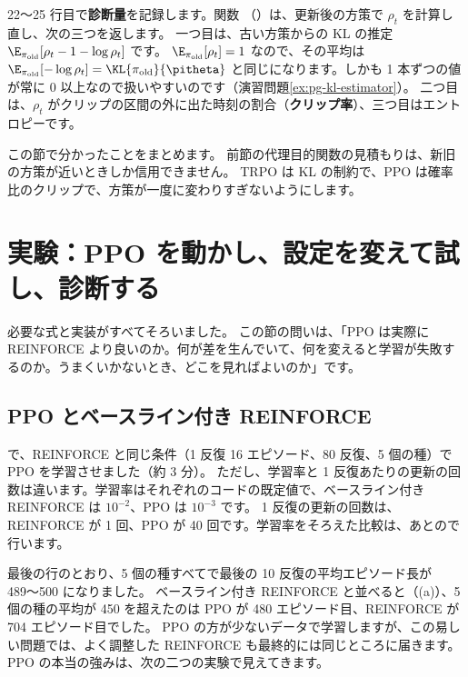 22〜25 行目で\textbf{診断量}を記録します。関数 （）は、更新後の方策で $\rho_t$ を計算し直し、次の三つを返します。
一つ目は、古い方策からの KL の推定 $\E_{\pi_{\text{old}}}[\rho_t-1-\log\rho_t]$ です。
$\E_{\pi_{\text{old}}}[\rho_t]=1$ なので、その平均は $\E_{\pi_{\text{old}}}[-\log\rho_t]=\KL{\pi_{\text{old}}}{\pitheta}$ と同じになります。しかも 1 本ずつの値が常に 0 以上なので扱いやすいのです（演習問題\ref{ex:pg-kl-estimator}）。
二つ目は、$\rho_t$ がクリップの区間の外に出た時刻の割合（\textbf{クリップ率}）、三つ目はエントロピーです。

この節で分かったことをまとめます。
前節の代理目的関数の見積もりは、新旧の方策が近いときしか信用できません。
TRPO は KL の制約で、PPO は確率比のクリップで、方策が一度に変わりすぎないようにします。

\section{実験：PPO を動かし、設定を変えて試し、診断する}\label{sec:pg-experiments}

必要な式と実装がすべてそろいました。
この節の問いは、「PPO は実際に REINFORCE より良いのか。何が差を生んでいて、何を変えると学習が失敗するのか。うまくいかないとき、どこを見ればよいのか」です。

\subsection*{PPO とベースライン付き REINFORCE}

 で、REINFORCE と同じ条件（1 反復 16 エピソード、80 反復、5 個の種）で PPO を学習させました（約 3 分）。
ただし、学習率と 1 反復あたりの更新の回数は違います。学習率はそれぞれのコードの既定値で、ベースライン付き REINFORCE は $10^{-2}$、PPO は $10^{-3}$ です。
1 反復の更新の回数は、REINFORCE が 1 回、PPO が 40 回です。学習率をそろえた比較は、あとので行います。


最後の行のとおり、5 個の種すべてで最後の 10 反復の平均エピソード長が 489〜500 になりました。
ベースライン付き REINFORCE と並べると（(a)）、5 個の種の平均が 450 を超えたのは PPO が 480 エピソード目、REINFORCE が 704 エピソード目でした。
PPO の方が少ないデータで学習しますが、この易しい問題では、よく調整した REINFORCE も最終的には同じところに届きます。
PPO の本当の強みは、次の二つの実験で見えてきます。

